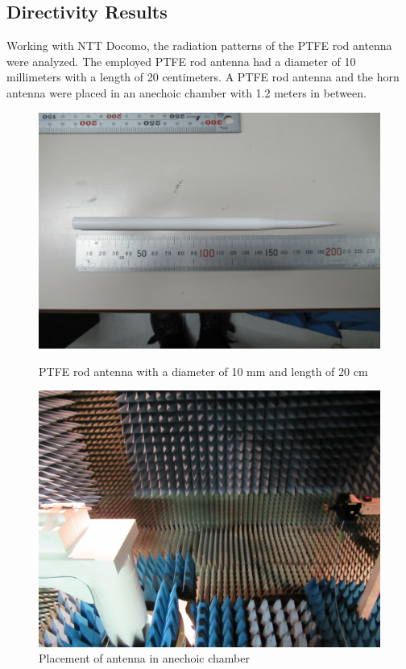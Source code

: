 \documentclass[a4paper,12pt]{report}
\begin{document}
\subsection{Directivity Results}

Working with NTT Docomo,
the radiation patterns of the PTFE rod antenna were analyzed.
The employed PTFE rod antenna had a diameter of 10 millimeters
with a length of 20 centimeters.
A PTFE rod antenna and the horn antenna were placed in
an anechoic chamber with 1.2 meters in between.

\begin{figure}
  \centering
  \begin{minipage}{0.45\textwidth}
    \centering
    \includegraphics[clip, keepaspectratio, width=0.9\linewidth]{img/ptfe_rod_antenna_20cm.jpg}
    \caption{PTFE rod antenna with a diameter of 10 mm and length of 20 cm}
    \label{fig:ptfe_rod_antenna_20cm} 
  \end{minipage}\hfill
  \begin{minipage}{0.45\textwidth}
    \centering
    \includegraphics[clip, keepaspectratio, width=0.9\linewidth]{img/anechoic_chamber_120_centimeters.jpg}
    \caption{Placement of antenna in anechoic chamber}
    \label{img:anechoic_chamber_120_centimeters}
  \end{minipage}\hfill
\end{figure}
\end{document}
